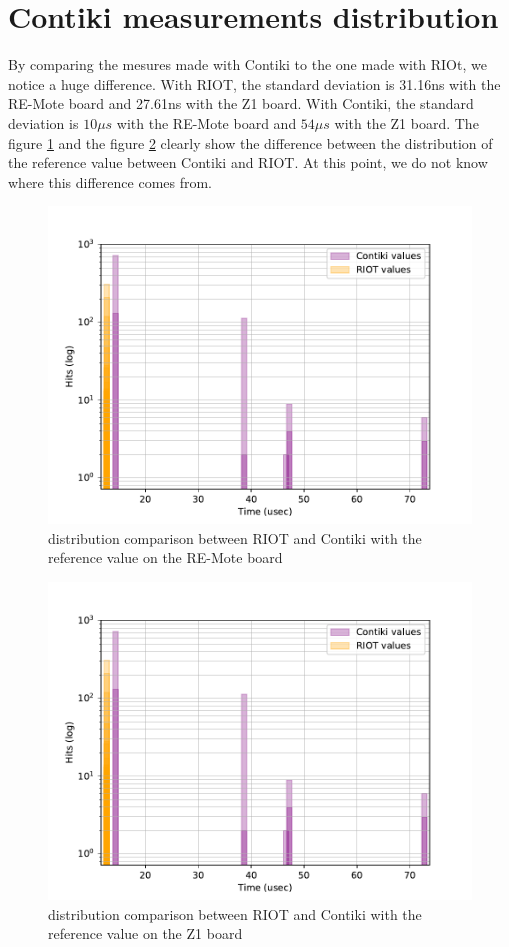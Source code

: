 \newpage
\section{Contiki measurements distribution}

By comparing the mesures made with Contiki to the one made with RIOt, we notice a huge difference.
With RIOT, the standard deviation is 31.16ns with the RE-Mote board and 27.61ns with the Z1 board.
With Contiki, the standard deviation is $10\mu s$ with the RE-Mote board and $54\mu s$ with the Z1 board.
The figure \ref{fig:deviation-ref-value-remote} and the figure \ref{fig:deviation-ref-value-z1} clearly show the difference between the distribution of the reference value between Contiki and RIOT.
At this point, we do not know where this difference comes from.

\begin{figure}[!ht]
  \centering
  \includegraphics[scale=.7]{assets/offset-remote.pdf}
  \caption{distribution comparison between RIOT and Contiki with the reference value on the RE-Mote board\label{fig:deviation-ref-value-remote}}
\end{figure}

\begin{figure}[!ht]
  \centering
  \includegraphics[scale=.7]{assets/offset-remote.pdf}
  \caption{distribution comparison between RIOT and Contiki with the reference value on the Z1 board\label{fig:deviation-ref-value-z1}}
\end{figure}